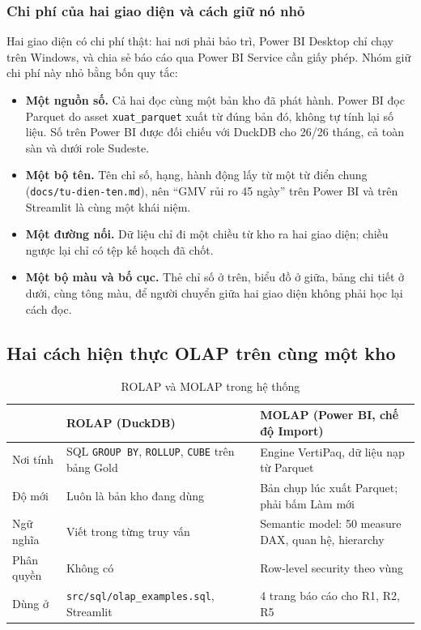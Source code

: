 \subsubsection*{Chi phí của hai giao diện và cách giữ nó nhỏ}
Hai giao diện có chi phí thật: hai nơi phải bảo trì, Power BI Desktop chỉ chạy trên Windows, và chia sẻ báo cáo qua Power BI Service cần giấy phép. Nhóm giữ chi phí này nhỏ bằng bốn quy tắc:
\begin{itemize}
    \item \textbf{Một nguồn số.} Cả hai đọc cùng một bản kho đã phát hành. Power BI đọc Parquet do asset \texttt{xuat\_parquet} xuất từ đúng bản đó, không tự tính lại số liệu. Số trên Power BI được đối chiếu với DuckDB cho 26/26 tháng, cả toàn sàn và dưới role Sudeste.
    \item \textbf{Một bộ tên.} Tên chỉ số, hạng, hành động lấy từ một từ điển chung (\texttt{docs/}\allowbreak\texttt{tu-dien-ten.md}), nên ``GMV rủi ro 45 ngày'' trên Power BI và trên Streamlit là cùng một khái niệm.
    \item \textbf{Một đường nối.} Dữ liệu chỉ đi một chiều từ kho ra hai giao diện; chiều ngược lại chỉ có tệp kế hoạch đã chốt.
    \item \textbf{Một bộ màu và bố cục.} Thẻ chỉ số ở trên, biểu đồ ở giữa, bảng chi tiết ở dưới, cùng tông màu, để người chuyển giữa hai giao diện không phải học lại cách đọc.
\end{itemize}

\subsection{Hai cách hiện thực OLAP trên cùng một kho}
\begin{table}[htbp]
\centering
\small
\caption{ROLAP và MOLAP trong hệ thống}
\label{tab:rolap_molap}
\begin{tabularx}{\textwidth}{|>{\raggedright\arraybackslash}m{2.4cm}|L|L|}
\hline
 & \textbf{ROLAP (DuckDB)} & \textbf{MOLAP (Power BI, chế độ Import)} \\
\hline
Nơi tính & SQL \texttt{GROUP BY}, \texttt{ROLLUP}, \texttt{CUBE} trên bảng Gold & Engine VertiPaq, dữ liệu nạp từ Parquet \\
\hline
Độ mới & Luôn là bản kho đang dùng & Bản chụp lúc xuất Parquet; phải bấm Làm mới \\
\hline
Ngữ nghĩa & Viết trong từng truy vấn & Semantic model: 50 measure DAX, quan hệ, hierarchy \\
\hline
Phân quyền & Không có & Row-level security theo vùng \\
\hline
Dùng ở & \texttt{src/sql/olap\_examples.sql}, Streamlit & 4 trang báo cáo cho R1, R2, R5 \\
\hline
\end{tabularx}
\end{table}

